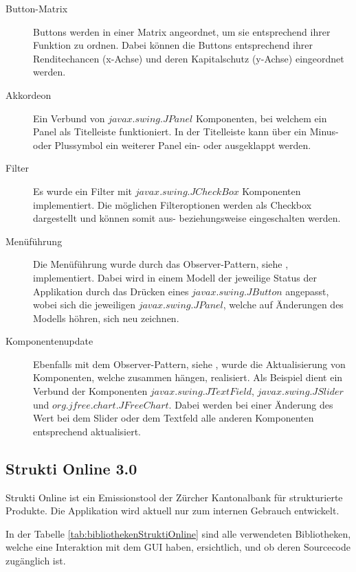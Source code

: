  \begin{description}
    \item[Button-Matrix]
    Buttons werden in einer Matrix angeordnet, um sie entsprechend ihrer
    Funktion zu ordnen. Dabei können die Buttons entsprechend ihrer
    Renditechancen (x-Achse) und deren Kapitalschutz (y-Achse) eingeordnet
    werden.
    \item[Akkordeon]
    Ein Verbund von \(javax.swing.JPanel\) Komponenten, bei welchem ein
    Panel als Titelleiste funktioniert. In der Titelleiste kann über ein Minus-
    oder Plussymbol ein weiterer Panel ein- oder ausgeklappt werden.
    \item[Filter]
    Es wurde ein Filter mit \(javax.swing.JCheckBox\) Komponenten implementiert.
    Die möglichen Filteroptionen werden als Checkbox dargestellt und können
    somit aus- beziehungsweise eingeschalten werden.
    \item[Menüführung]
    Die Menüführung wurde durch das Observer-Pattern, siehe
    \cite{ObserverDesignPattern}, implementiert. Dabei wird in einem Modell
    der jeweilige Status der Applikation durch das Drücken eines
    \(javax.swing.JButton\) angepasst, wobei sich die jeweiligen
    \(javax.swing.JPanel\), welche auf Änderungen des Modells höhren, sich neu
    zeichnen.
    \item[Komponentenupdate]
    Ebenfalls mit dem Observer-Pattern, siehe \cite{ObserverDesignPattern},
    wurde die Aktualisierung von Komponenten, welche zusammen hängen,
    realisiert. Als Beispiel dient ein Verbund der Komponenten
    \(javax.swing.JTextField\), \(javax.swing.JSlider\) und
    \(org.jfree.chart.JFreeChart\). Dabei werden bei einer Änderung des Wert bei
    dem Slider oder dem Textfeld alle anderen Komponenten entsprechend
    aktualisiert.
  \end{description}
  
  \subsection{Strukti Online 3.0}
  
  Strukti Online ist ein Emissionstool der Zürcher Kantonalbank für
  strukturierte Produkte. Die Applikation wird aktuell nur zum internen
  Gebrauch entwickelt.
  
  In der Tabelle \ref{tab:bibliothekenStruktiOnline} sind alle verwendeten
  Bibliotheken, welche eine Interaktion mit dem \ac{GUI} haben, ersichtlich,
  und ob deren Sourcecode zugänglich ist.
  
